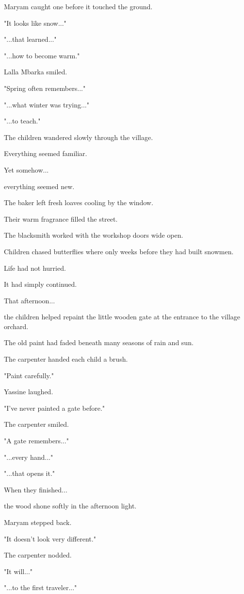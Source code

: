 \documentclass[12pt,openany]{book}
\begin{document}
Maryam caught one before it touched the ground.

"It looks like snow..."

"...that learned..."

"...how to become warm."

Lalla Mbarka smiled.

"Spring often remembers..."

"...what winter was trying..."

"...to teach."

The children wandered slowly through the village.

Everything seemed familiar.

Yet somehow...

everything seemed new.

The baker left fresh loaves cooling by the window.

Their warm fragrance filled the street.

The blacksmith worked with the workshop doors wide open.

Children chased butterflies where only weeks before they had built snowmen.

Life had not hurried.

It had simply continued.

That afternoon...

the children helped repaint the little wooden gate at the entrance to the village orchard.

The old paint had faded beneath many seasons of rain and sun.

The carpenter handed each child a brush.

"Paint carefully."

Yassine laughed.

"I've never painted a gate before."

The carpenter smiled.

"A gate remembers..."

"...every hand..."

"...that opens it."

When they finished...

the wood shone softly in the afternoon light.

Maryam stepped back.

"It doesn't look very different."

The carpenter nodded.

"It will..."

"...to the first traveler..."
\end{document}
